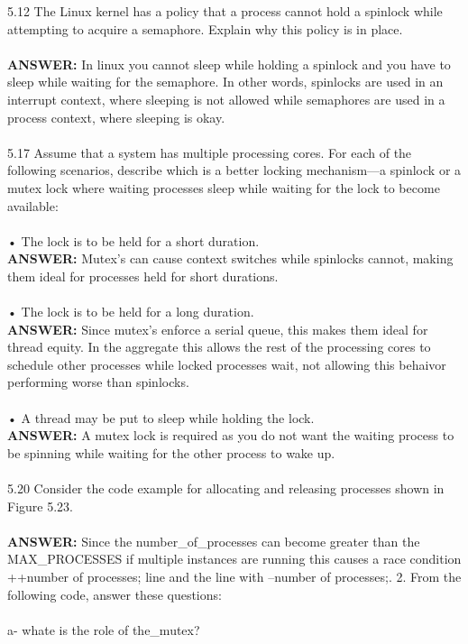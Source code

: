 \documentclass[12pt]{article}
\begin{document}
5.12 The Linux kernel has a policy that a process cannot hold a spinlock while
attempting to acquire a semaphore. Explain why this policy is in place.\\\\
\textbf{ANSWER: } In linux you cannot sleep while holding a spinlock and you have to 
sleep while waiting for the semaphore. In other words, spinlocks are used in an interrupt 
context, where sleeping is not allowed while semaphores are used in a process context, 
where sleeping is okay.\\\\
5.17 Assume that a system has multiple processing cores. For each of the
following scenarios, describe which is a better locking mechanism—a
spinlock or a mutex lock where waiting processes sleep while waiting
for the lock to become available:\\\\
• The lock is to be held for a short duration.\\
\textbf{ANSWER: }Mutex's can cause context switches while spinlocks cannot, making 
them ideal for processes held for short durations.\\\\
• The lock is to be held for a long duration.\\
\textbf{ANSWER: }Since mutex's enforce a serial queue, this makes them ideal for thread 
equity. In the aggregate this allows the rest of the processing cores to schedule 
other processes while locked processes wait, not allowing this behaivor performing worse 
than spinlocks.\\\\
• A thread may be put to sleep while holding the lock.\\
\textbf{ANSWER: }A mutex lock is required as you do not want the waiting process to be 
spinning while waiting for the other process to wake up.\\\\
5.20 Consider the code example for allocating and releasing processes shown
in Figure 5.23.\\\\
\textbf{ANSWER: }Since the number\_of\_processes can become greater than the MAX\_PROCESSES if
multiple instances are running this causes a race condition ++number of processes; line and 
the line with --number of processes;.
2. From the following code, answer these questions:\\\\
a- whate is the role of the\_mutex?\\\\
\end{document}
